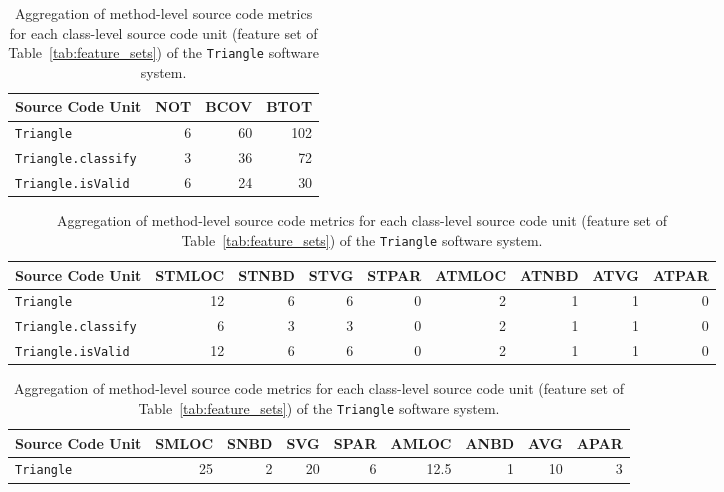 \begin{table}
  \centering
  \caption{Extracted coverage test suite metrics (feature set  of Table~\ref{tab:feature_sets}) of the \texttt{Triangle} software system.}
  \label{tab:triangle_coverage_metrics}
  \begin{tabular}{|l|r|r|r|}
    \hline
    \rowcolor[RGB]{169,196,223}
    \textbf{Source Code Unit} & \textbf{NOT} & \textbf{BCOV} & \textbf{BTOT} \\
    \hline \texttt{Triangle} & 6 & 60 & 102 \\
    \hline \texttt{Triangle.classify} & 3 & 36 & 72 \\
    \hline \texttt{Triangle.isValid} & 6 & 24 & 30 \\
    \hline
  \end{tabular}
  
  \vspace{3em}
  
  \centering
  \caption{Merged test suite metrics (feature set  in Table~\ref{tab:feature_sets}) for each source code unit of the \texttt{Triangle} software system.}
  \label{tab:triangle_merge_test_metrics}
  \begin{tabular}{|l|r|r|r|r|r|r|r|r|}
    \hline
    \rowcolor[RGB]{169,196,223}
    \textbf{Source Code Unit} & \textbf{STMLOC} & \textbf{STNBD} & \textbf{STVG} & \textbf{STPAR} & \textbf{ATMLOC} & \textbf{ATNBD} & \textbf{ATVG} & \textbf{ATPAR}  \\
    \hline \texttt{Triangle} & 12 & 6 & 6 & 0 & 2 & 1 & 1 & 0 \\
    \hline \texttt{Triangle.classify} & 6 & 3 & 3 & 0 & 2 & 1 & 1 & 0 \\
    \hline \texttt{Triangle.isValid} & 12 & 6 & 6 & 0 & 2 & 1 & 1 & 0 \\
    \hline
  \end{tabular}

  \vspace{3em}

  \centering
  \caption{Aggregation of method-level source code metrics for each class-level source code unit (feature set  of Table~\ref{tab:feature_sets}) of the \texttt{Triangle} software system.}
  \label{tab:triangle_aggregate_metrics}
  \begin{tabular}{|l|r|r|r|r|r|r|r|r|}
    \hline
    \rowcolor[RGB]{169,196,223}
    \textbf{Source Code Unit} & \textbf{SMLOC} & \textbf{SNBD} & \textbf{SVG} & \textbf{SPAR} & \textbf{AMLOC} & \textbf{ANBD} & \textbf{AVG} & \textbf{APAR}  \\
    \hline \texttt{Triangle} & 25 & 2 & 20 & 6 & 12.5 & 1 & 10 & 3 \\
    \hline
  \end{tabular}
\end{table}
\afterpage\clearpage


